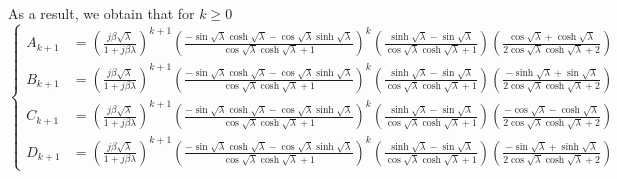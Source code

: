 \documentclass{article}
\begin{document}
As a result, we obtain that for $k \geq 0$
\scriptsize
\begin{equation}
    \left\{\begin{aligned}
        A_{k+1} &= \left( \frac{j \beta \sqrt{\lambda }}{1+j \beta \lambda } \right)^{k+1} \left( \frac{ -\sin\sqrt{\lambda} \cosh\sqrt{\lambda} - \cos\sqrt{\lambda} \sinh\sqrt{\lambda} }{ \cos\sqrt{\lambda }\cosh\sqrt{\lambda }+1 } \right)^k \left( \frac{\sinh\sqrt{\lambda }-\sin\sqrt{\lambda }}{\cos\sqrt{\lambda } \cosh\sqrt{\lambda }+1} \right) \left(\frac{\cos\sqrt{\lambda }+\cosh\sqrt{\lambda }}{2 \cos\sqrt{\lambda }\cosh\sqrt{\lambda }+2} \right) \\
        B_{k+1} &= \left( \frac{j \beta \sqrt{\lambda }}{1+j \beta \lambda } \right)^{k+1}  \left( \frac{ -\sin\sqrt{\lambda} \cosh\sqrt{\lambda} - \cos\sqrt{\lambda} \sinh\sqrt{\lambda} }{ \cos\sqrt{\lambda }\cosh\sqrt{\lambda }+1 } \right)^k \left( \frac{\sinh\sqrt{\lambda }-\sin\sqrt{\lambda }}{\cos\sqrt{\lambda } \cosh\sqrt{\lambda }+1} \right) \left( \frac{-\sinh\sqrt{\lambda }+\sin\sqrt{\lambda }}{2 \cos\sqrt{\lambda }\cosh\sqrt{\lambda }+2} \right) \\
        C_{k+1} &= \left( \frac{j \beta \sqrt{\lambda }}{1+j \beta \lambda } \right)^{k+1}  \left( \frac{ -\sin\sqrt{\lambda} \cosh\sqrt{\lambda} - \cos\sqrt{\lambda} \sinh\sqrt{\lambda} }{ \cos\sqrt{\lambda }\cosh\sqrt{\lambda }+1 } \right)^k \left( \frac{\sinh\sqrt{\lambda }-\sin\sqrt{\lambda }}{\cos\sqrt{\lambda } \cosh\sqrt{\lambda }+1} \right) \left( \frac{-\cos\sqrt{\lambda }-\cosh\sqrt{\lambda }}{2 \cos\sqrt{\lambda } \cosh\sqrt{\lambda }+2} \right) \\
        D_{k+1} &= \left( \frac{j \beta \sqrt{\lambda }}{1+j \beta \lambda } \right)^{k+1} \left( \frac{ -\sin\sqrt{\lambda} \cosh\sqrt{\lambda} - \cos\sqrt{\lambda} \sinh\sqrt{\lambda} }{ \cos\sqrt{\lambda }\cosh\sqrt{\lambda }+1 } \right)^k \left( \frac{\sinh\sqrt{\lambda }-\sin\sqrt{\lambda }}{\cos\sqrt{\lambda } \cosh\sqrt{\lambda }+1} \right) \left( \frac{-\sin\sqrt{\lambda }+\sinh\sqrt{\lambda }}{2 \cos\sqrt{\lambda }\cosh\sqrt{\lambda }+2} \right)
    \end{aligned}\right.
\end{equation}
\normalsize
\end{document}
